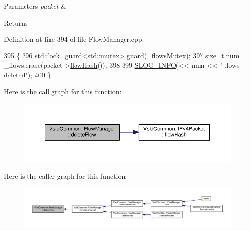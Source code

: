 \begin{DoxyParams}{Parameters}
{\em packet} & \\
\hline
\end{DoxyParams}
\begin{DoxyReturn}{Returns}

\end{DoxyReturn}


Definition at line 394 of file Flow\-Manager.\-cpp.


\begin{DoxyCode}
395 \{
396     std::lock\_guard<std::mutex> guard(\_flowsMutex);
397     \textcolor{keywordtype}{size\_t} num = \_flows.erase(packet->\hyperlink{class_vsid_common_1_1_i_pv4_packet_a75fde96785c70c7a818a165482eae5e5}{flowHash}());
398 
399     \hyperlink{_logger_8h_a119c1c29ba35a8db38e2358e41167282}{SLOG\_INFO}(<< num << \textcolor{stringliteral}{" flows deleted"});
400 \}
\end{DoxyCode}


Here is the call graph for this function\-:
\nopagebreak
\begin{figure}[H]
\begin{center}
\leavevmode
\includegraphics[width=350pt]{class_vsid_common_1_1_flow_manager_a5e3d398ded3ad62f8677cab1515f5c4e_cgraph}
\end{center}
\end{figure}




Here is the caller graph for this function\-:
\nopagebreak
\begin{figure}[H]
\begin{center}
\leavevmode
\includegraphics[width=350pt]{class_vsid_common_1_1_flow_manager_a5e3d398ded3ad62f8677cab1515f5c4e_icgraph}
\end{center}
\end{figure}


